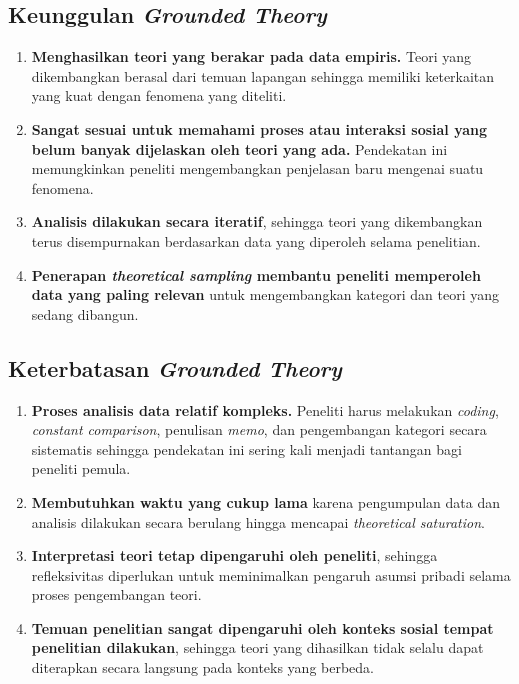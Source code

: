 \documentclass[
  indonesian,
  letterpaper,
  DIV=11,
  numbers=noendperiod]{scrreprt}
\providecommand{\tightlist}{%
  \setlength{\itemsep}{0pt}\setlength{\parskip}{0pt}}
\begin{document}
\subsection{\texorpdfstring{Keunggulan \emph{Grounded
Theory}}{Keunggulan Grounded Theory}}\label{keunggulan-grounded-theory}

\begin{enumerate}
\def\labelenumi{\arabic{enumi}.}
\tightlist
\item
  \textbf{Menghasilkan teori yang berakar pada data empiris.} Teori yang
  dikembangkan berasal dari temuan lapangan sehingga memiliki
  keterkaitan yang kuat dengan fenomena yang diteliti.
\item
  \textbf{Sangat sesuai untuk memahami proses atau interaksi sosial yang
  belum banyak dijelaskan oleh teori yang ada.} Pendekatan ini
  memungkinkan peneliti mengembangkan penjelasan baru mengenai suatu
  fenomena.
\item
  \textbf{Analisis dilakukan secara iteratif}, sehingga teori yang
  dikembangkan terus disempurnakan berdasarkan data yang diperoleh
  selama penelitian.
\item
  \textbf{Penerapan \emph{theoretical sampling} membantu peneliti
  memperoleh data yang paling relevan} untuk mengembangkan kategori dan
  teori yang sedang dibangun.
\end{enumerate}

\subsection{\texorpdfstring{Keterbatasan \emph{Grounded
Theory}}{Keterbatasan Grounded Theory}}\label{keterbatasan-grounded-theory}

\begin{enumerate}
\def\labelenumi{\arabic{enumi}.}
\tightlist
\item
  \textbf{Proses analisis data relatif kompleks.} Peneliti harus
  melakukan \emph{coding}, \emph{constant comparison}, penulisan
  \emph{memo}, dan pengembangan kategori secara sistematis sehingga
  pendekatan ini sering kali menjadi tantangan bagi peneliti pemula.
\item
  \textbf{Membutuhkan waktu yang cukup lama} karena pengumpulan data dan
  analisis dilakukan secara berulang hingga mencapai \emph{theoretical
  saturation}.
\item
  \textbf{Interpretasi teori tetap dipengaruhi oleh peneliti}, sehingga
  refleksivitas diperlukan untuk meminimalkan pengaruh asumsi pribadi
  selama proses pengembangan teori.
\item
  \textbf{Temuan penelitian sangat dipengaruhi oleh konteks sosial
  tempat penelitian dilakukan}, sehingga teori yang dihasilkan tidak
  selalu dapat diterapkan secara langsung pada konteks yang berbeda.
\end{enumerate}
\end{document}
